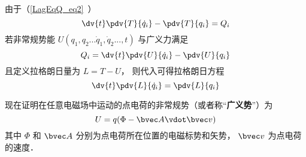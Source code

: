
\begin{issues}
\issueDraft
\end{issues}


由于（\autoref{LagEqQ_eq2}~）
\begin{equation}
\dv{t}\pdv{T}{\dot q_i} - \pdv{T}{q_i} = Q_i
\end{equation}
若非常规势能  $U(q_1, q_2...\dot q_1, \dot q_2..., t)$ 与广义力满足
\begin{equation}\label{EMLagP_eq2}
Q_i = \dv{t} \pdv{U}{\dot q_i} - \pdv{U}{q_i}
\end{equation}
且定义拉格朗日量为 $L = T - U$， 则代入可得拉格朗日方程
\begin{equation}
\dv{t} \pdv{L}{\dot q_i} = \pdv{L}{q_i}
\end{equation}

现在证明在任意电磁场中运动的点电荷的非常规势（或者称“\textbf{广义势}”）为
\begin{equation}\label{EMLagP_eq4}
U = q(\Phi  - \bvec A \vdot \bvec v)
\end{equation}
其中 $\Phi$ 和 $\bvec A$ 分别为点电荷所在位置的电磁标势和矢势， $\bvec v$ 为点电荷的速度．

